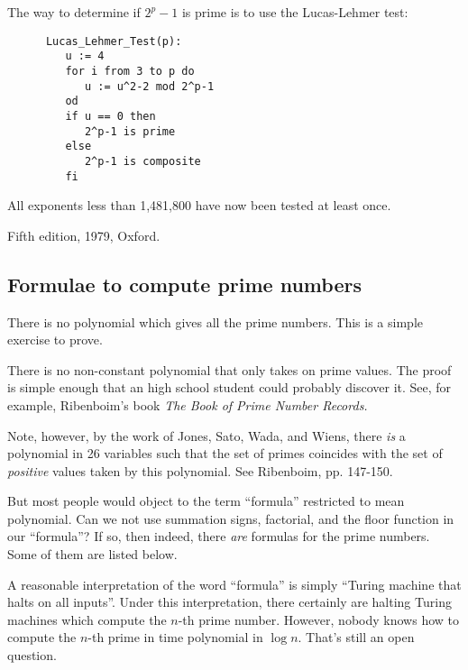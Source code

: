 \bigskip
\bigskip

    The way to determine if $2^p-1$ is prime is to use the Lucas-Lehmer 
    test:

\begin{verbatim}
      Lucas_Lehmer_Test(p):
         u := 4
         for i from 3 to p do
            u := u^2-2 mod 2^p-1
         od
         if u == 0 then
            2^p-1 is prime
         else
            2^p-1 is composite
         fi
\end{verbatim}

  All exponents less than 1,481,800 have now been tested at least once.


\Ref

{Fifth edition, 1979, Oxford.}
 


\subsection{Formulae to compute prime numbers}


     There is no polynomial which gives all the prime numbers. This is
     a simple exercise to prove.

\noindent There is no non-constant polynomial that only takes on prime values.
      The proof is simple enough that an high school student could probably
      discover it.  See, for example, Ribenboim's book {\it The Book of Prime
      Number Records.}

     Note, however, by the work of Jones, Sato, Wada, and Wiens, there 
     {\it is} a
     polynomial in 26 variables such that the set of primes coincides with
     the set of {\it positive} values taken by this polynomial.  See Ribenboim,
     pp. 147-150.

     But most people would object to the term ``formula'' restricted to mean
     polynomial.  Can we not use summation signs, factorial, and the floor
     function in our ``formula''?  If so, then indeed, there {\it are} formulas
     for the prime numbers.  Some of them are listed below.

     A reasonable interpretation of
     the word ``formula'' is simply ``Turing machine that halts on all inputs''.
     Under this interpretation, there certainly are halting Turing machines
     which compute the $n$-th prime number.  However, nobody knows how to
     compute the $n$-th prime in time polynomial in $\log n$.  That's still
     an open question.

